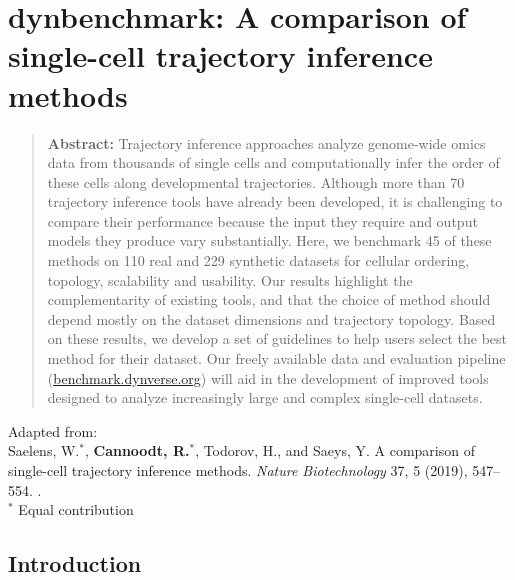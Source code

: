 \newpage{\thispagestyle{empty}\cleardoublepage}
\chapter{dynbenchmark: A comparison of single-cell trajectory inference methods} 
\label{chap:dynbenchmark}

\begin{quote}
	\textbf{Abstract:} Trajectory inference approaches analyze genome-wide omics data from thousands of single cells and computationally infer the order of these cells along developmental trajectories. Although more than 70 trajectory inference tools have already been developed, it is challenging to compare their performance because the input they require and output models they produce vary substantially. Here, we benchmark 45 of these methods on 110 real and 229 synthetic datasets for cellular ordering, topology, scalability and usability. Our results highlight the complementarity of existing tools, and that the choice of method should depend mostly on the dataset dimensions and trajectory topology. Based on these results, we develop a set of guidelines to help users select the best method for their dataset. Our freely available data and evaluation pipeline (\href{https://benchmark.dynverse.org}{benchmark.dynverse.org}) will aid in the development of improved tools designed to analyze increasingly large and complex single-cell datasets.
\end{quote}

\vfill

Adapted from:\\
Saelens, W.$^*$, \textbf{Cannoodt, R.}$^*$, Todorov, H., and Saeys, Y. A comparison of single-cell trajectory inference methods. \textit{Nature Biotechnology} 37, 5 (2019), 547--554. .\\
{\footnotesize $^*$ Equal contribution}
\newpage

\section{Introduction}

